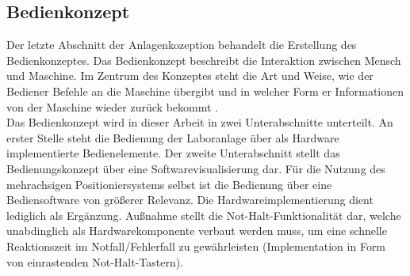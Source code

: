 \documentclass[../../../Bachelorarbeit.tex]{subfiles}
\begin{document}
\subsection{Bedienkonzept}
Der letzte Abschnitt der Anlagenkozeption behandelt die Erstellung des Bedienkonzeptes. Das Bedienkonzept beschreibt die Interaktion zwischen Mensch und Maschine. Im Zentrum des Konzeptes steht die Art und Weise, wie der Bediener Befehle an die Maschine übergibt und in welcher Form er Informationen von der Maschine wieder zurück bekommt \cite[170]{Wietzke2012}. \\
Das Bedienkonzept wird in dieser Arbeit in zwei Unterabschnitte unterteilt. An erster Stelle steht die Bedienung der Laboranlage über als Hardware implementierte Bedienelemente. Der zweite Unterabschnitt stellt das Bedienungskonzept über eine Softwarevisualisierung dar. Für die Nutzung des mehrachsigen Positioniersystems selbst ist die Bedienung über eine Bediensoftware von größerer Relevanz. Die Hardwareimplementierung dient lediglich als Ergänzung. Außnahme stellt die Not-Halt-Funktionalität dar, welche unabdinglich als Hardwarekomponente verbaut werden muss, um eine schnelle Reaktionszeit im Notfall/Fehlerfall zu gewährleisten (Implementation in Form von einrastenden Not-Halt-Tastern).
\end{document}
